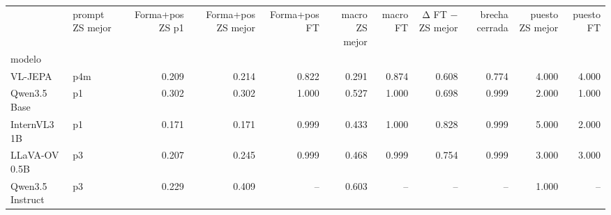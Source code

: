 \begin{tabular}{llrrrrrrrrr}
\toprule
 & prompt ZS mejor & Forma+pos ZS p1 & Forma+pos ZS mejor & Forma+pos FT & macro ZS mejor & macro FT & Δ FT − ZS mejor & brecha cerrada & puesto ZS mejor & puesto FT \\
modelo &  &  &  &  &  &  &  &  &  &  \\
\midrule
VL-JEPA & p4m & 0.209 & 0.214 & 0.822 & 0.291 & 0.874 & 0.608 & 0.774 & 4.000 & 4.000 \\
Qwen3.5 Base & p1 & 0.302 & 0.302 & 1.000 & 0.527 & 1.000 & 0.698 & 0.999 & 2.000 & 1.000 \\
InternVL3 1B & p1 & 0.171 & 0.171 & 0.999 & 0.433 & 1.000 & 0.828 & 0.999 & 5.000 & 2.000 \\
LLaVA-OV 0.5B & p3 & 0.207 & 0.245 & 0.999 & 0.468 & 0.999 & 0.754 & 0.999 & 3.000 & 3.000 \\
Qwen3.5 Instruct & p3 & 0.229 & 0.409 & -- & 0.603 & -- & -- & -- & 1.000 & -- \\
\bottomrule
\end{tabular}
